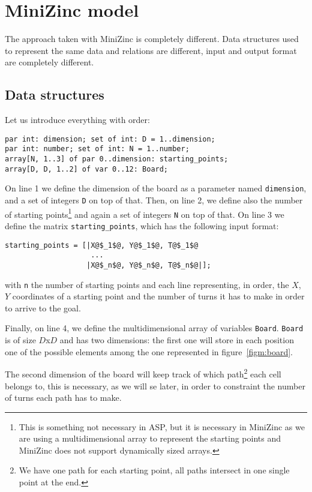 \section{MiniZinc model}

The approach taken with MiniZinc is completely different. Data structures used to represent the same data and relations are different, input and output format are completely different.
\subsection{Data structures}
Let us introduce everything with order:
\begin{verbatim}
par int: dimension; set of int: D = 1..dimension; 
par int: number; set of int: N = 1..number; 
array[N, 1..3] of par 0..dimension: starting_points; 
array[D, D, 1..2] of var 0..12: Board;
\end{verbatim}


On line 1 we define the dimension of the board as a parameter named \texttt{dimension}, and a set of integers \texttt{D} on top of that.
Then, on line 2, we define also the number of starting points\footnote{This is something not necessary in ASP, but it is necessary in MiniZinc as we are using a multidimensional array to represent the starting points and MiniZinc does not support dynamically sized arrays.} and again a set of integers \texttt{N} on top of that.
On line 3 we define the matrix \texttt{starting_points}, which has the following input format:
\begin{verbatim}
starting_points = [|X@$_1$@, Y@$_1$@, T@$_1$@
                    ...
                   |X@$_n$@, Y@$_n$@, T@$_n$@|];
\end{verbatim}
with  \texttt{n} the number of starting points and each line representing, in order, the $X$, $Y$ coordinates of a starting point and the number of turns it has to make in order to arrive to the goal.


Finally, on line 4, we define the multidimensional array of variables \texttt{Board}. \texttt{Board} is of size $D$x$D$ and has two dimensions: the first one will store in each position one of the possible elements among the one represented in figure~\ref{figm:board}.

The second dimension of the board will keep track of which path\footnote{We have one path for each starting point, all paths intersect in one single point at the end.} each cell belongs to, this is necessary, as we will se later, in order to constraint the number of turns each path has to make.

